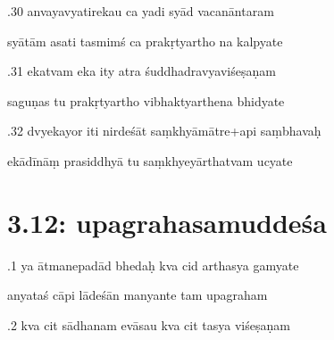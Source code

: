 \documentclass[article,12pt,a4paper]{memoir}%
\newcounter{parCount}
\begin{document}
	  
	  \pstart {}.30 anvayavyatirekau ca yadi syād vacanāntaram 
	{}
	\pend%
      

	  
	  \pstart \leavevmode%
	syātām asati tasmimś ca prakṛtyartho na kalpyate 
	{}
	\pend%
      

	  
	  \pstart {}.31 ekatvam eka ity atra śuddhadravyaviśeṣaṇam 
	{}
	\pend%
      

	  
	  \pstart \leavevmode%
	saguṇas tu prakṛtyartho vibhaktyarthena bhidyate 
	{}
	\pend%
      

	  
	  \pstart {}.32 dvyekayor iti nirdeśāt saṃkhyāmātre+api saṃbhavaḥ 
	{}
	\pend%
      

	  
	  \pstart \leavevmode%
	ekādīnāṃ prasiddhyā tu saṃkhyeyārthatvam ucyate 
	{}
	\pend%
      
	  
	
\chapter[{3.12: upagrahasamuddeśa}][{3.12: upagrahasamuddeśa}]{ 3.12: upagrahasamuddeśa}

	  
	  \pstart {}.1 ya ātmanepadād bhedaḥ kva cid arthasya gamyate 
	{}
	\pend%
      

	  
	  \pstart \leavevmode%
	anyataś cāpi lādeśān manyante tam upagraham 
	{}
	\pend%
      

	  
	  \pstart {}.2 kva cit sādhanam evāsau kva cit tasya viśeṣaṇam 
	{}
	\pend%
      
\end{document}
